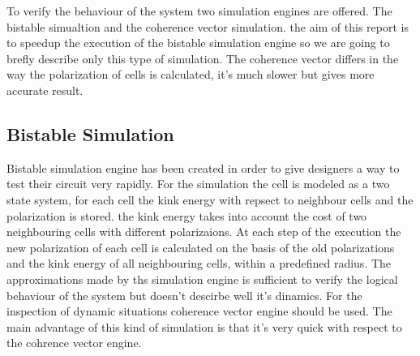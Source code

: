 To verify the behaviour of the system two simulation engines are offered. The bistable simualtion and the coherence vector simulation. the aim of this report is to speedup the execution of the bistable simulation engine so we are going to brefly describe only this type of simulation. The coherence vector differs in the way the polarization of cells is calculated, it's much slower but gives more accurate result.


\subsection{Bistable Simulation}
Bistable simulation engine has been created in order to give designers a way to test their circuit very rapidly. For the simulation the cell is modeled as a two state system, for each cell the kink energy with repsect to neighbour cells and the polarization is stored. the kink energy takes into account the cost of two neighbouring cells with different polarizaions. At each step of the execution the new polarization of each cell is calculated on the basis of the old polarizations and the kink energy of all neighbouring cells, within a predefined radius. The approximations made by ths simulation engine is sufficient to verify the logical behaviour of the system but doesn't descirbe well it's dinamics. For the inspection of dynamic situations coherence vector engine should be used. The main advantage of this kind of simulation is that it's very quick with respect to the cohrence vector engine. 

